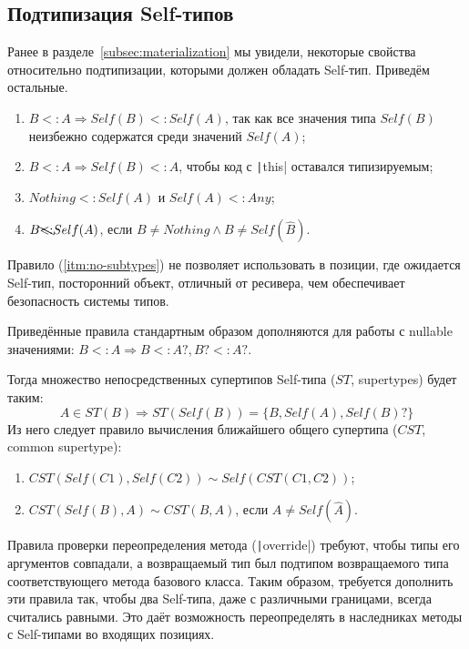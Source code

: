 \subsection{Подтипизация Self-типов} \label{subsec:self-subtyping}

Ранее в разделе~\ref{subsec:materialization} мы увидели, некоторые свойства относительно подтипизации, которыми должен обладать Self-тип.
Приведём остальные.

\begin{enumerate}
    \item \label{itm:self-covariant} $B <: A \Rightarrow Self(B) <: Self(A)$, так как все значения типа $Self(B)$ неизбежно содержатся среди значений $Self(A)$;
    \item \label{itm:this-subtype} $B <: A \Rightarrow Self(B) <: A$, чтобы код с \texttt|this| оставался типизируемым;
    \item \label{itm:any-nothing} $Nothing <: Self(A)$ и $Self(A) <: Any$;
    \item \label{itm:no-subtypes} $B \bcancel{<:} Self(A)$, если $B \neq Nothing \land B \neq Self(\widehat{B})$.
\end{enumerate}

Правило (\ref{itm:no-subtypes}) не позволяет использовать в позиции, где ожидается Self-тип, посторонний объект, отличный от ресивера, чем обеспечивает безопасность системы типов.

Приведённые правила стандартным образом дополняются для работы с nullable значениями:
$B <: A \Rightarrow B <: A?, B? <: A?$.

Тогда множество непосредственных супертипов Self-типа ($ST$, supertypes) будет таким:
\[ A \in ST(B) \Rightarrow ST\left(Self(B)\right) = \{ B, Self(A), Self(B)? \} \]
Из него следует правило вычисления ближайшего общего супертипа ($CST$, common supertype):
\begin{enumerate}
    \item $CST\left(Self(C1), Self(C2)\right) \sim Self(CST(C1, C2))$;
    \item $CST\left(Self(B), A\right) \sim CST(B, A)$, если $A \neq Self(\widehat{A})$.
\end{enumerate}

Правила проверки переопределения метода (\texttt|override|) требуют, чтобы типы его аргументов совпадали, а возвращаемый тип был подтипом возвращаемого типа соответствующего метода базового класса.
Таким образом, требуется дополнить эти правила так, чтобы два Self-типа, даже с различными границами, всегда считались равными.
Это даёт возможность переопределять в наследниках методы с Self-типами во входящих позициях.


